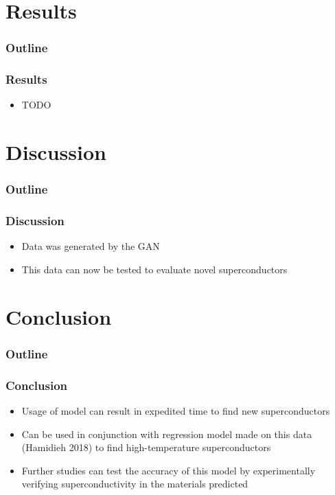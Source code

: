 \documentclass[12pt]{beamer}
\begin{document}
\section{Results}
\begin{frame}
\frametitle{Outline}
\tableofcontents[currentsection]
\end{frame}

\begin{frame}

\frametitle{Results}
\begin{itemize}
    \item TODO
\end{itemize}

\end{frame}

\section{Discussion}
\begin{frame}
\frametitle{Outline}
\tableofcontents[currentsection]
\end{frame}

\begin{frame}
\frametitle{Discussion}
\pause
\begin{itemize}
  \item Data was generated by the GAN
  \pause
  \item This data can now be tested to evaluate novel superconductors
\end{itemize}
\pause

\end{frame}

\section{Conclusion}
\begin{frame}
\frametitle{Outline}
\tableofcontents[currentsection]
\end{frame}

\begin{frame}
\frametitle{Conclusion}
\pause
\begin{itemize}
  \item Usage of model can result in expedited time to find new superconductors
  \pause
  \item Can be used in conjunction with regression model made on this data (Hamidieh 2018) to find high-temperature superconductors
  \pause
  \item Further studies can test the accuracy of this model by experimentally verifying superconductivity in the materials predicted
\end{itemize}



\end{frame}
\end{document}
